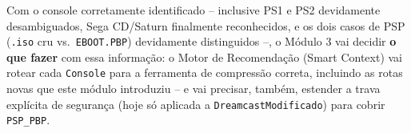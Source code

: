 \begin{CaixaResumo}
Com o console corretamente identificado -- inclusive PS1 e PS2 devidamente desambiguados, Sega CD/Saturn finalmente reconhecidos, e os dois casos de PSP (\texttt{.iso} cru vs.\ \texttt{EBOOT.PBP}) devidamente distinguidos --, o Módulo 3 vai decidir \textbf{o que fazer} com essa informação: o Motor de Recomendação (Smart Context) vai rotear cada \texttt{Console} para a ferramenta de compressão correta, incluindo as rotas novas que este módulo introduziu -- e vai precisar, também, estender a trava explícita de segurança (hoje só aplicada a \texttt{DreamcastModificado}) para cobrir \texttt{PSP\_PBP}.
\end{CaixaResumo}
